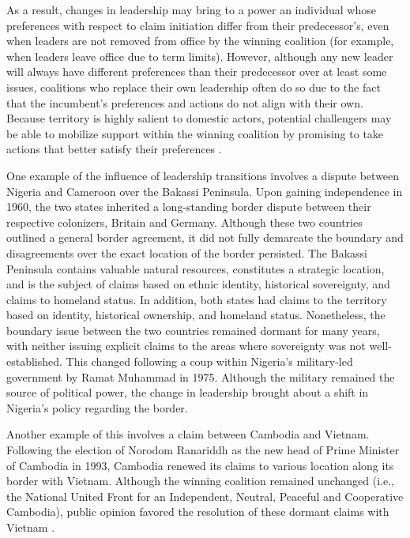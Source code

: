 
As a result, changes in leadership may bring to a power an individual whose preferences with respect to claim initiation differ from their predecessor’s, even when leaders are not removed from office by the winning coalition (for example, when leaders leave office due to term limits). However, although any new leader will always have different preferences than their predecessor over at least some issues, coalitions who replace their own leadership often do so due to the fact that the incumbent’s preferences and actions do not align with their own. Because territory is highly salient to domestic actors, potential challengers may be able to mobilize support within the winning coalition by promising to take actions that better satisfy their preferences \citep{colaresi2004, colaresi2005, vasquez2009}. 


One example of the influence of leadership transitions involves a dispute between Nigeria and Cameroon over the Bakassi Peninsula. Upon gaining independence in 1960, the two states inherited a long-standing border dispute between their respective colonizers, Britain and Germany. Although these two countries outlined a general border agreement, it did not fully demarcate the boundary and disagreements over the exact location of the border persisted. The Bakassi Peninsula contains valuable natural resources, constitutes a strategic location, and is the subject of claims based on ethnic identity, historical sovereignty, and claims to homeland status. In addition, both states had claims to the territory based on identity, historical ownership, and homeland status. Nonetheless, the boundary issue between the two countries remained dormant for many years, with neither issuing explicit claims to the areas where sovereignty was not well-established. This changed following a coup within Nigeria’s military-led government by Ramat Muhammad in 1975. Although the military remained the source of political power, the change in leadership brought about a shift in Nigeria’s policy regarding the border.


Another example of this involves a claim between Cambodia and Vietnam. Following the election of Norodom Ranariddh as the new head of Prime Minister of Cambodia in 1993, Cambodia renewed its claims to various location along its border with Vietnam. Although the winning coalition remained unchanged (i.e., the National United Front for an Independent, Neutral, Peaceful and Cooperative Cambodia), public opinion favored the resolution of these dormant claims with Vietnam \citep{amer1997}.

